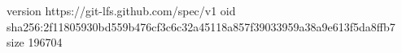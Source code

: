 version https://git-lfs.github.com/spec/v1
oid sha256:2f11805930bd559b476cf3c6c32a45118a857f39033959a38a9e613f5da8ffb7
size 196704
